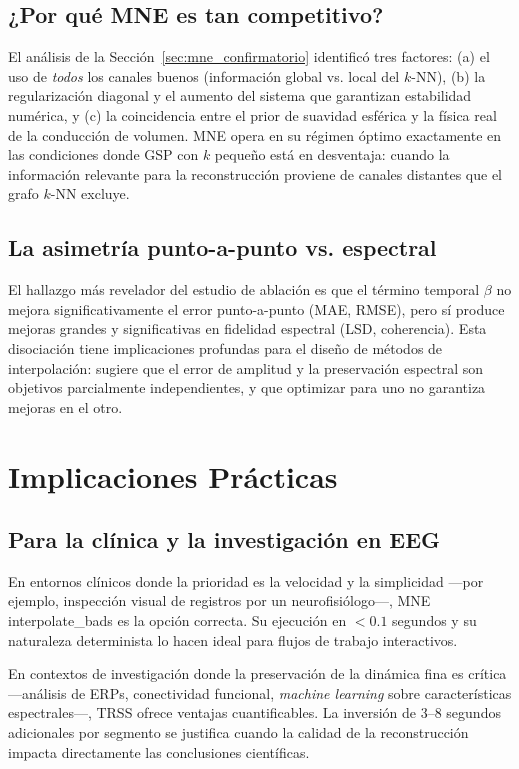\subsection{¿Por qué MNE es tan competitivo?}

El análisis de la Sección~\ref{sec:mne_confirmatorio} identificó tres factores: (a) el uso de \textit{todos} los canales buenos (información global vs. local del $k$-NN), (b) la regularización diagonal y el aumento del sistema que garantizan estabilidad numérica, y (c) la coincidencia entre el prior de suavidad esférica y la física real de la conducción de volumen. MNE opera en su régimen óptimo exactamente en las condiciones donde GSP con $k$ pequeño está en desventaja: cuando la información relevante para la reconstrucción proviene de canales distantes que el grafo $k$-NN excluye.

\subsection{La asimetría punto-a-punto vs. espectral}

El hallazgo más revelador del estudio de ablación es que el término temporal $\beta$ no mejora significativamente el error punto-a-punto (MAE, RMSE), pero sí produce mejoras grandes y significativas en fidelidad espectral (LSD, coherencia). Esta disociación tiene implicaciones profundas para el diseño de métodos de interpolación: sugiere que el error de amplitud y la preservación espectral son objetivos parcialmente independientes, y que optimizar para uno no garantiza mejoras en el otro.

\section{Implicaciones Prácticas}

\subsection{Para la clínica y la investigación en EEG}

En entornos clínicos donde la prioridad es la velocidad y la simplicidad —por ejemplo, inspección visual de registros por un neurofisiólogo—, MNE interpolate\_bads es la opción correcta. Su ejecución en $< 0.1$ segundos y su naturaleza determinista lo hacen ideal para flujos de trabajo interactivos.

En contextos de investigación donde la preservación de la dinámica fina es crítica —análisis de ERPs, conectividad funcional, \textit{machine learning} sobre características espectrales—, TRSS ofrece ventajas cuantificables. La inversión de 3--8 segundos adicionales por segmento se justifica cuando la calidad de la reconstrucción impacta directamente las conclusiones científicas.

